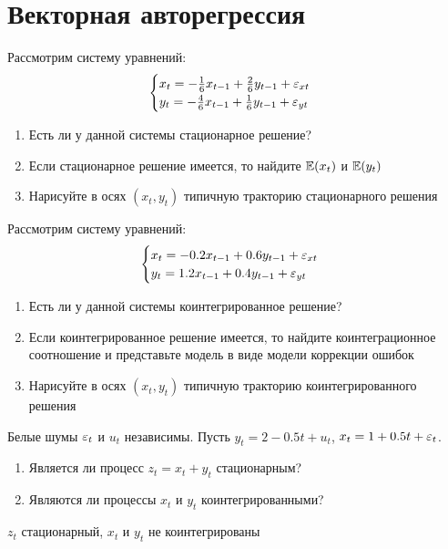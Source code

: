 

\chapter{Векторная авторегрессия}



\begin{problem}
Рассмотрим систему уравнений:
\[
\begin{cases}
x_t = -\frac{1}{6}x_{t-1} + \frac{2}{6}y_{t-1} + \varepsilon_{xt} \\
y_t = -\frac{4}{6}x_{t-1} + \frac{1}{6}y_{t-1} + \varepsilon_{yt}
\end{cases}
\]
\begin{enumerate}
\item Есть ли у данной системы стационарное решение?
\item Если стационарное решение имеется, то найдите $\operatorname{\mathbb{E}}(x_t)$ и $\operatorname{\mathbb{E}}(y_t)$
\item Нарисуйте в осях $(x_t, y_t)$ типичную тракторию стационарного решения
\end{enumerate}

\begin{sol}

\end{sol}
\end{problem}


\begin{problem}
Рассмотрим систему уравнений:
\[
\begin{cases}
x_t = -0.2x_{t-1} + 0.6y_{t-1} + \varepsilon_{xt} \\
y_t = 1.2x_{t-1} + 0.4y_{t-1} + \varepsilon_{yt}
\end{cases}
\]
\begin{enumerate}
\item Есть ли у данной системы коинтегрированное решение?
\item Если коинтегрированное решение имеется, то найдите коинтеграционное соотношение и представьте модель в виде модели коррекции ошибок
\item Нарисуйте в осях $(x_t, y_t)$ типичную тракторию коинтегрированного решения
\end{enumerate}

\begin{sol}

\end{sol}
\end{problem}



\begin{problem}
Белые шумы $\varepsilon_t$ и $u_t$ независимы. Пусть $y_t=2-0.5t+u_t$, $x_t=1+0.5t+\varepsilon_t$.
\begin{enumerate}
\item Является ли процесс $z_t=x_t+y_t$ стационарным?
\item Являются ли процессы $x_t$ и $y_t$ коинтегрированными?
\end{enumerate}
\begin{sol}

$z_t$ стационарный, $x_t$ и $y_t$ не коинтегрированы
\end{sol}
\end{problem}


